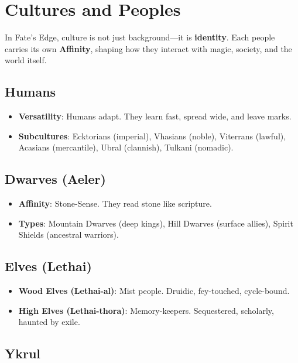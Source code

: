 \section*{Cultures and Peoples}

In Fate's Edge, culture is not just background---it is \textbf{identity}. Each people carries its own \textbf{Affinity}, shaping how they interact with magic, society, and the world itself.

\subsection*{Humans}

\begin{itemize}
    \item \textbf{Versatility}: Humans adapt. They learn fast, spread wide, and leave marks.
    \item \textbf{Subcultures}: Ecktorians (imperial), Vhasians (noble), Viterrans (lawful), Acasians (mercantile), Ubral (clannish), Tulkani (nomadic).
\end{itemize}

\subsection*{Dwarves (Aeler)}

\begin{itemize}
    \item \textbf{Affinity}: Stone-Sense. They read stone like scripture.
    \item \textbf{Types}: Mountain Dwarves (deep kings), Hill Dwarves (surface allies), Spirit Shields (ancestral warriors).
\end{itemize}

\subsection*{Elves (Lethai)}

\begin{itemize}
    \item \textbf{Wood Elves (Lethai-al)}: Mist people. Druidic, fey-touched, cycle-bound.
    \item \textbf{High Elves (Lethai-thora)}: Memory-keepers. Sequestered, scholarly, haunted by exile.
\end{itemize}

\subsection*{Ykrul}

